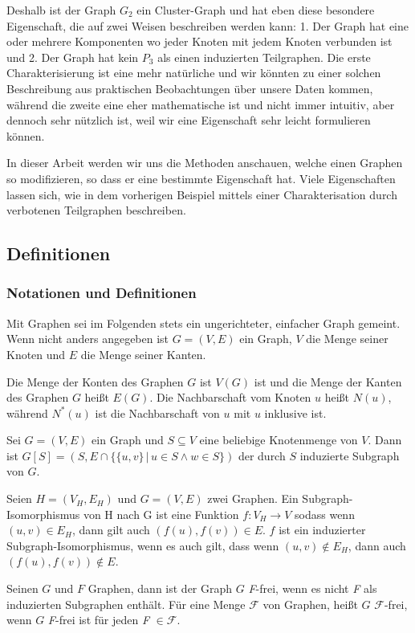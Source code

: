 \documentclass[12pt,a4paper,onecolumn,oneside,titlepage]{article}
\newcommand\cursive[1]{\ensuremath{\mathcal{#1}}}
\begin{document}
Deshalb ist der Graph $G_2$ ein Cluster-Graph und hat eben diese besondere Eigenschaft, die auf zwei Weisen beschreiben werden kann: 1. Der Graph hat eine oder mehrere Komponenten wo jeder Knoten mit jedem Knoten verbunden ist und 2. Der Graph hat kein $P_3$ als einen induzierten Teilgraphen. Die erste Charakterisierung ist eine mehr natürliche und wir könnten zu einer solchen Beschreibung aus praktischen Beobachtungen über unsere Daten kommen, während die zweite eine eher mathematische ist und nicht immer intuitiv, aber dennoch sehr nützlich ist, weil wir eine Eigenschaft sehr leicht formulieren können.

In dieser Arbeit werden wir uns die Methoden anschauen, welche einen Graphen so modifizieren, so dass er eine bestimmte Eigenschaft hat. Viele Eigenschaften lassen sich, wie in dem vorherigen Beispiel mittels einer Charakterisation durch verbotenen Teilgraphen beschreiben.


\subsection{Definitionen}
\subsubsection{Notationen und Definitionen}
\label{sec:notation}
Mit Graphen sei im Folgenden stets ein ungerichteter, einfacher Graph gemeint. Wenn nicht anders angegeben ist $G=(V,E)$ ein Graph, $V$ die Menge seiner Knoten und $E$ die Menge seiner Kanten.

Die Menge der Konten des Graphen $G$ ist $V(G)$ ist und die Menge der Kanten des Graphen $G$ heißt $E(G)$. Die Nachbarschaft vom Knoten $u$ heißt $N(u)$,  während $N^{*}(u)$ ist die Nachbarschaft von $u$ mit $u$ inklusive ist.

Sei $G = (V,E)$ ein Graph und $S \subseteq V$ eine beliebige Knotenmenge von $V$. 
Dann ist $G[S] = (S, E \cap \{\{u,v\} \,|\, u \in S \land w \in S\})$ der durch $S$ induzierte Subgraph von $G$.

Seien $H = (V_H,E_H)$ und $G =(V,E)$ zwei Graphen. Ein Subgraph-Isomorphismus von H nach G ist eine Funktion $f : V_H \rightarrow V$ sodass wenn $(u,v) \in E_H $, dann gilt auch $(f(u),f(v)) \in E$. $f$ ist ein induzierter Subgraph-Isomorphismus, wenn es auch gilt, dass wenn $(u,v) \notin E_H$, dann auch $(f(u),f(v)) \notin E$.

Seinen $G$ und $F$ Graphen, dann ist der Graph $G$ \textit{F}-frei, wenn es nicht \textit{F} als induzierten Subgraphen enthält.
Für eine Menge \cursive{F} von Graphen, heißt $G$ \cursive{F}-frei, wenn $G$ \textit{F}-frei ist für jeden \textit{F} $\in \cursive{F}$.
\end{document}
